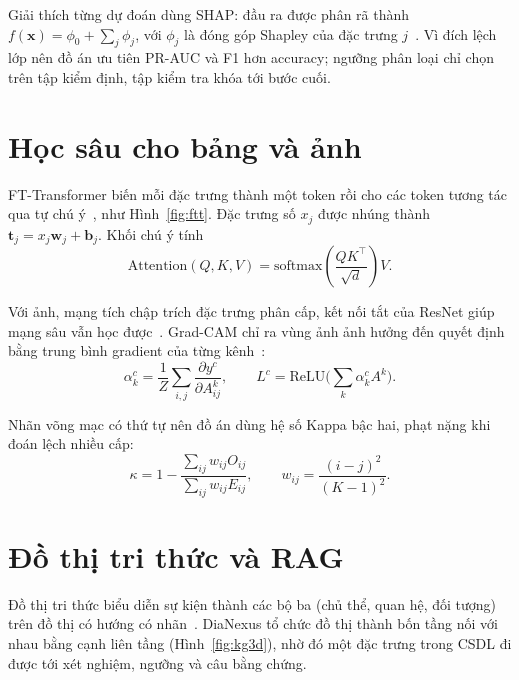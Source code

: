 Giải thích từng dự đoán dùng SHAP: đầu ra được phân rã thành $f(\mathbf{x})=\phi_0+\sum_j\phi_j$, với $\phi_j$ là đóng góp Shapley của đặc trưng $j$~\cite{shap}. Vì đích lệch lớp nên đồ án ưu tiên PR-AUC và F1 hơn accuracy; ngưỡng phân loại chỉ chọn trên tập kiểm định, tập kiểm tra khóa tới bước cuối.

\section{Học sâu cho bảng và ảnh}

FT-Transformer biến mỗi đặc trưng thành một token rồi cho các token tương tác qua tự chú ý~\cite{ftt}, như Hình~\ref{fig:ftt}. Đặc trưng số $x_j$ được nhúng thành $\mathbf{t}_j=x_j\mathbf{w}_j+\mathbf{b}_j$. Khối chú ý tính
\begin{equation}
\mathrm{Attention}(Q,K,V)=\mathrm{softmax}\!\left(\frac{QK^{\top}}{\sqrt{d}}\right)V.
\end{equation}


Với ảnh, mạng tích chập trích đặc trưng phân cấp, kết nối tắt của ResNet giúp mạng sâu vẫn học được~\cite{resnet}. Grad-CAM chỉ ra vùng ảnh ảnh hưởng đến quyết định bằng trung bình gradient của từng kênh~\cite{gradcam}:
\begin{equation}
\alpha_k^{c}=\frac{1}{Z}\sum_{i,j}\frac{\partial y^{c}}{\partial A^{k}_{ij}},\qquad
L^{c}=\mathrm{ReLU}\Big(\sum_k\alpha_k^{c}A^{k}\Big).
\end{equation}


Nhãn võng mạc có thứ tự nên đồ án dùng hệ số Kappa bậc hai, phạt nặng khi đoán lệch nhiều cấp:
\begin{equation}
\kappa=1-\frac{\sum_{ij}w_{ij}O_{ij}}{\sum_{ij}w_{ij}E_{ij}},\qquad w_{ij}=\frac{(i-j)^2}{(K-1)^2}.
\end{equation}

\section{Đồ thị tri thức và RAG}

Đồ thị tri thức biểu diễn sự kiện thành các bộ ba (chủ thể, quan hệ, đối tượng) trên đồ thị có hướng có nhãn~\cite{kg}. DiaNexus tổ chức đồ thị thành bốn tầng nối với nhau bằng cạnh liên tầng (Hình~\ref{fig:kg3d}), nhờ đó một đặc trưng trong CSDL đi được tới xét nghiệm, ngưỡng và câu bằng chứng.

